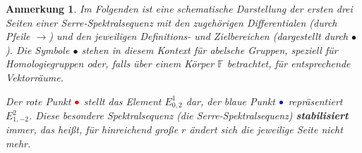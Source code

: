 \documentclass[12pt]{article}
\numberwithin{conj}{section}
\newtheorem{remark}[conj]{Anmerkung}
\begin{document}
\begin{remark}
    Im Folgenden ist eine schematische Darstellung der ersten drei Seiten einer Serre-Spektralsequenz mit den zugehörigen Differentialen (durch Pfeile $\rightarrow$) und den jeweiligen Definitions- und Zielbereichen (dargestellt durch $\bullet$). Die Symbole $\bullet$ stehen in diesem Kontext für abelsche Gruppen, speziell für Homologiegruppen oder, falls über einem Körper $\mathbb{F}$ betrachtet, für entsprechende Vektorräume. 
    
    Der rote Punkt $\color{red}\bullet$ stellt das Element $E^1_{0,2}$ dar, der blaue Punkt $\color{blue}\bullet$ repräsentiert $E^2_{1,-2}$. Diese besondere Spektralsequenz (die Serre-Spektralsequenz) \textbf{stabilisiert} immer, das heißt, für hinreichend große $r$ ändert sich die jeweilige Seite nicht mehr.
    

\end{remark}
\end{document}
